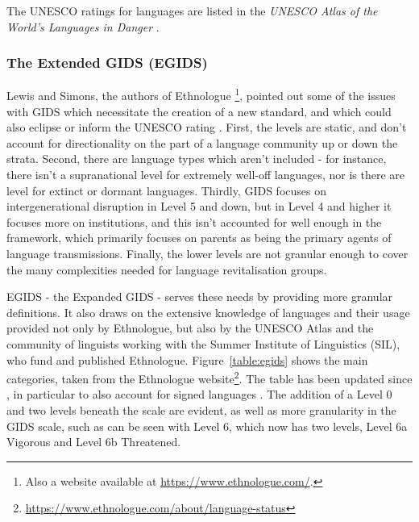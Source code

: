 The UNESCO ratings for languages are listed in the \textit{UNESCO Atlas of the World's Languages in Danger} \citep{unesco2014unesco}.

\subsubsection{The Extended GIDS (EGIDS)}

Lewis and Simons, the authors of Ethnologue \citep{lewis2009ethnologue}\footnote{Also a website available at \href{https://www.ethnologue.com/}{https://www.ethnologue.com/}.}, pointed out some of the issues with GIDS which necessitate the creation of a new standard, and which could also eclipse or inform the UNESCO rating \citep{lewis2010assessing}. First, the levels are static, and don't account for directionality on the part of a language community up or down the strata. Second, there are language types which aren't included - for instance, there isn't a supranational level for extremely well-off languages, nor is there are level for extinct or dormant languages. Thirdly, GIDS focuses on intergenerational disruption in Level 5 and down, but in Level 4 and higher it focuses more on institutions, and this isn't accounted for well enough in the framework, which primarily focuses on parents as being the primary agents of language transmissions. Finally, the lower levels are not granular enough to cover the many complexities needed for language revitalisation groups.

EGIDS - the Expanded GIDS - serves these needs by providing more granular definitions. It also draws on the extensive knowledge of languages and their usage provided not only by Ethnologue, but also by the UNESCO Atlas and the community of linguists working with the Summer Institute of Linguistics (SIL), who fund and published Ethnologue. Figure~\ref{table:egids} shows the main categories, taken from the Ethnologue website\footnote{\href{https://www.ethnologue.com/about/language-status}{https://www.ethnologue.com/about/language-status}}. The table has been updated since \citet{lewis2010assessing}, in particular to also account for signed languages \citep{bickford2015rating}. The addition of a Level 0 and two levels beneath the scale are evident, as well as more granularity in the GIDS scale, such as can be seen with Level 6, which now has two levels, Level 6a Vigorous and Level 6b Threatened.

